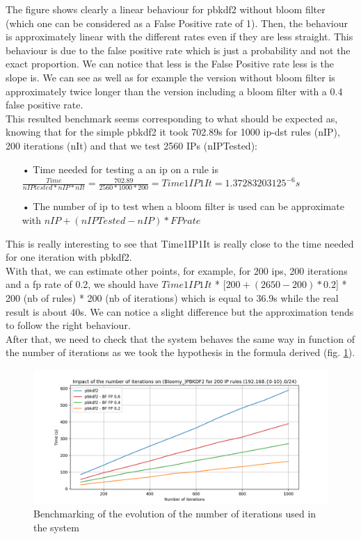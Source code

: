 \documentclass{eplmastersthesis}
\begin{document}
The figure shows clearly a linear behaviour for \gls{pbkdf2} without bloom filter (which one can be considered as a False Positive rate of 1). Then, the behaviour is approximately linear with the different rates even if they are less straight. This behaviour is due to the false positive rate which is just a probability and not the exact proportion. We can notice that less is the False Positive rate less is the slope is.
We can see as well as for example the version without bloom filter is approximately twice longer than the version including a bloom filter with a 0.4 false positive rate.\\

This resulted benchmark seems corresponding to what should be expected as, knowing that for the simple \gls{pbkdf2} it took 702.89s for 1000 ip-dst rules (nIP), 200 iterations (nIt) and that we test 2560 IPs (nIPTested):
\begin{itemize}
\item[•] Time needed for testing a an \gls{ip} on a rule is $\frac{Time}{nIPtested * nIP * nIt}=\frac{702.89}{2560*1000*200} = Time1IP1It = 1.37283203125^{-6}s$
\item[•] The number of \gls{ip} to test when a bloom filter is used can be approximate with $nIP + (nIPTested - nIP)*FPrate$
\end{itemize}
This is really interesting to see that Time1IP1It is really close to the time needed for one iteration with \gls{pbkdf2}.\\

With that, we can estimate other points, for example, for 200 \glspl{ip}, 200 iterations and a \gls{fp} rate of 0.2, we should have $Time1IP1It$ *  [$200 + (2650 - 200)*0.2$] * 200 (nb of rules) * 200 (nb of iterations) which is equal to 36.9s while the real result is about 40s. We can notice a slight difference but the approximation tends to follow the right behaviour.\\

After that, we need to check that the system behaves the same way in function of the number of iterations as we took the hypothesis in the formula derived (fig. \ref{benchmarking:timeiterations}). 

\begin{figure}[h!]
\begin{center}
	\includegraphics[scale=0.6]{res/TimeIterations}
	\caption{Benchmarking of the evolution of the number of iterations used in the system}
	\label{benchmarking:timeiterations}
\end{center}
\end{figure}
\end{document}
